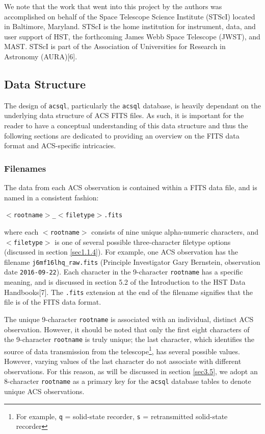 \documentclass[10pt,journal,compsoc]{IEEEtran}
\begin{document}
We note that the work that went into this project by the authors was accomplished on behalf of the Space Telescope Science Institute (STScI)
located in Baltimore, Maryland.  STScI is the home institution for instrument, data, and user support of HST, the forthcoming James Webb Space
Telescope (JWST), and MAST.  STScI is part of the Association of Universities for Research in Astronomy (AURA)[6].


\subsection{Data Structure} \label{sec1.1}

The design of \texttt{acsql}, particularly the \texttt{acsql} database, is heavily dependant on the underlying data structure of ACS FITS files.
As such, it is important for the reader to have a conceptual understanding of this data structure and thus the following sections are dedicated to
providing an overview on the FITS data format and ACS-specific intricacies.


\subsubsection{Filenames} \label{sec1.1.1}

The data from each ACS observation is contained within a FITS data file, and is named in a consistent fashion:\newline

\texttt{$<$rootname$>$\_$<$filetype$>$.fits}\newline

\noindent where each \texttt{$<$rootname$>$} consists of nine unique alpha-numeric characters, and \texttt{$<$filetype$>$} is one of several possible
three-character filetype options (discussed in section \ref{sec1.1.4}).  For example, one ACS observation has the filename \texttt{j6mf16lhq\_raw.fits}
(Principle Investigator Gary Bernstein, observation date \texttt{2016-09-22}).  Each character in the 9-character \texttt{rootname} has a specific meaning,
and is discussed in section 5.2 of the Introduction to the HST Data Handbooks[7].  The \texttt{.fits} extension at the end of the filename signifies
that the file is of the FITS data format.

The unique 9-character \texttt{rootname} is associated with an individual, distinct ACS observation. However, it should be noted that only the first
eight characters of the 9-character \texttt{rootname} is truly unique; the last character, which identifies the source of data transmission from the
telescope\footnote{For example, \texttt{q} = solid-state recorder, \texttt{s} = retransmitted solid-state recorder}, has several possible values.  However,
varying values of the last character do not associate with different observations.  For this reason, as will be discussed in section \ref{sec3.5}, we adopt
an 8-character \texttt{rootname} as a primary key for the \texttt{acsql} database tables to denote unique ACS observations.
\end{document}
